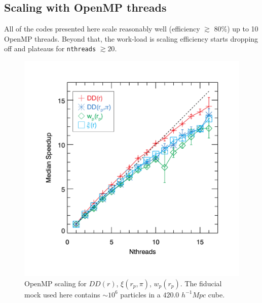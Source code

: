 \documentclass[12pt,titlepage]{article}
\newcommand{\xir}{\ensuremath{{DD(r)}}\xspace}
\newcommand{\wprp}{\ensuremath{{w_p(r_p)}}\xspace}
\newcommand{\xirppi}{\ensuremath{{\xi(r_p,\pi)}}\xspace}
\newcommand{\hMpc}{\ensuremath{{h^{-1}Mpc}}\xspace}
\begin{document}
\subsection{Scaling with OpenMP threads}
All of the codes presented here scale reasonably well (efficiency $\gtrsim$ 80\%) up to 10 OpenMP threads. Beyond that, the work-load is 
scaling efficiency starts dropping off and plateaus for \texttt{nthreads} $\gtrsim 20$. 
\begin{figure}[htbp]
\includegraphics[clip=true,width=\linewidth]{timings_Mr19_openmp}%
\caption{OpenMP scaling for \xir, \xirppi, \wprp. The fiducial mock used here contains $\sim 10^6$ particles 
in a $420.0$ \hMpc cube. }
\label{fig:scaling_openmp}
\end{figure}
\end{document}
